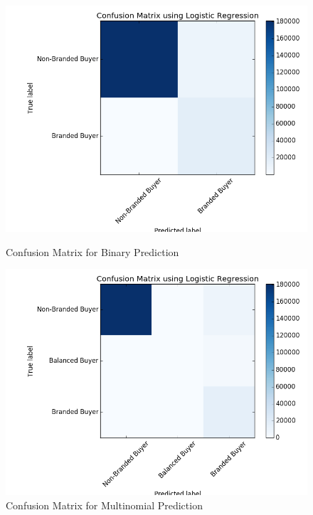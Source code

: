\documentclass[conference]{IEEEtran}
\begin{document}
\begin{figure}[t]
    \centering
    \begin{minipage}{.5\textwidth}
        \centering
        \includegraphics[width=1\linewidth, height=0.30\textheight]{confusion-matrix-binary}
        \caption{Confusion Matrix for Binary Prediction}
    \end{minipage}
    \begin{minipage}{0.5\textwidth}
        \centering
        \includegraphics[width=1\linewidth, height=0.30\textheight]{confusion-matrix-multinomial}
        \caption{Confusion Matrix for Multinomial Prediction}
    \end{minipage}
\end{figure}
\end{document}
